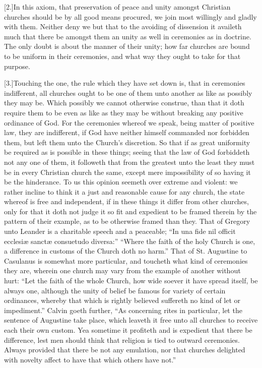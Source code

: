 [2.]In this axiom, that preservation of peace and unity amongst Christian churches should be by all good means procured, we join most willingly and gladly with them. Neither deny we but that to the avoiding of dissension it availeth much that there be amongst them an unity as well in ceremonies as in doctrine. The only doubt is about the manner of their unity; how far churches are bound to be uniform in their ceremonies, and what way they ought to take for that purpose.

[3.]Touching the one, the rule which they have set down is, that in ceremonies indifferent, all churches ought to be one of them unto another as like as possibly they may be. Which possibly we cannot otherwise construe, than that it  doth require them to be even as like as they may be without breaking any positive ordinance of God. For the ceremonies whereof we speak, being matter of positive law, they are indifferent, if God have neither himself commanded nor forbidden them, but left them unto the Church’s discretion. So that if as great uniformity be required as is possible in these things; seeing that the law of God forbiddeth not any one of them, it followeth that from the greatest unto the least they must be in every Christian church the same, except mere impossibility of so having it be the hinderance. To us this opinion seemeth over extreme and violent: we rather incline to think it a just and reasonable cause for any church, the state whereof is free and independent, if in these things it differ from other churches, only for that it doth not judge it so fit and expedient to be framed therein by the pattern of their example, as to be otherwise framed than they. That of Gregory unto Leander is a charitable speech and a peaceable; “In una fide nil officit ecclesiæ sanctæ consuetudo diversa:” “Where the faith of the holy Church is one, a difference in customs of the Church doth no harm.” That of St. Augustine to Casulanus is somewhat more particular, and toucheth what kind of ceremonies they are, wherein one church may vary from the example of another without hurt: “Let the faith of the whole Church, how wide soever it have spread itself, be always one, although the unity of belief be famous for variety of certain ordinances, whereby that which is rightly believed suffereth no kind of let or impediment.” Calvin goeth further, “As concerning rites in particular, let the sentence of Augustine take place, which leaveth it free unto all churches to receive each their own custom. Yea sometime it profiteth and is expedient that there be difference, lest men should think that religion is tied to outward ceremonies. Always provided that there be not any emulation, nor that churches delighted with novelty affect to have that which others have not.”


